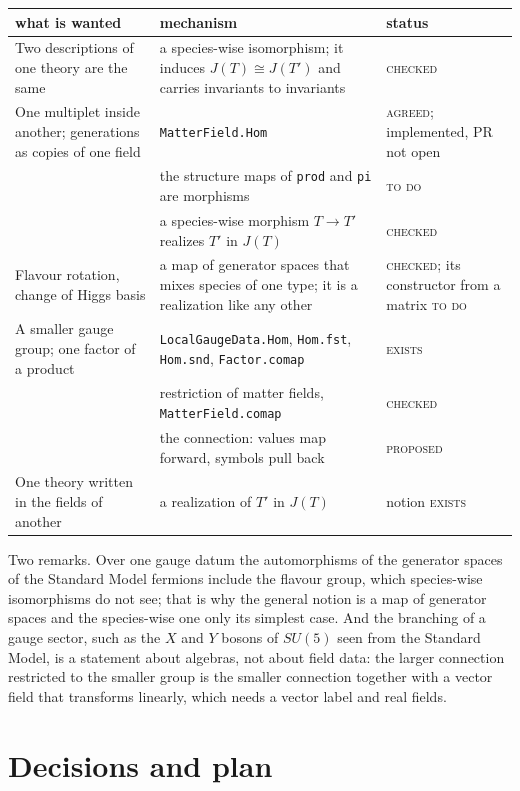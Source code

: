 \documentclass[11pt,a4paper]{article}
\newcommand{\lean}[1]{{\footnotesize\upshape\ttfamily\nolinkurl{#1}}}
\newcommand{\stE}{\textsc{exists}}
\newcommand{\stC}{\textsc{checked}}
\newcommand{\stP}{\textsc{proposed}}
\newcommand{\stT}{\textsc{to do}}
\newcommand{\stA}{\textsc{agreed}}
\begin{document}
\begin{center}\small
\begin{tabular}{@{}>{\raggedright\arraybackslash}p{42mm}>{\raggedright\arraybackslash}p{76mm}>{\raggedright\arraybackslash}p{32mm}@{}}
\toprule
what is wanted & mechanism & status \\
\midrule
Two descriptions of one theory are the same & a species-wise isomorphism; it induces $J(T)\cong J(T')$ and carries invariants to invariants & \stC \\
\addlinespace[3pt]
One multiplet inside another; generations as copies of one field & \lean{MatterField.Hom} & \stA; implemented, PR not open \\
 & the structure maps of \lean{prod} and \lean{pi} are morphisms & \stT \\
 & a species-wise morphism $T\to T'$ realizes $T'$ in $J(T)$ & \stC \\
\addlinespace[3pt]
Flavour rotation, change of Higgs basis & a map of generator spaces that mixes species of one type; it is a realization like any other & \stC; its constructor from a matrix \stT \\
\addlinespace[3pt]
A smaller gauge group; one factor of a product & \lean{LocalGaugeData.Hom}, \lean{Hom.fst}, \lean{Hom.snd}, \lean{Factor.comap} & \stE \\
 & restriction of matter fields, \lean{MatterField.comap} & \stC \\
 & the connection: values map forward, symbols pull back & \stP \\
\addlinespace[3pt]
One theory written in the fields of another & a realization of $T'$ in $J(T)$ & notion \stE \\
\bottomrule
\end{tabular}
\end{center}

Two remarks. Over one gauge datum the automorphisms of the generator spaces of the Standard Model fermions include the flavour group, which species-wise isomorphisms do not see; that is why the general notion is a map of generator spaces and the species-wise one only its simplest case. And the branching of a gauge sector, such as the $X$ and $Y$ bosons of $SU(5)$ seen from the Standard Model, is a statement about algebras, not about field data: the larger connection restricted to the smaller group is the smaller connection together with a vector field that transforms linearly, which needs a vector label and real fields.

\section{Decisions and plan}
\end{document}
